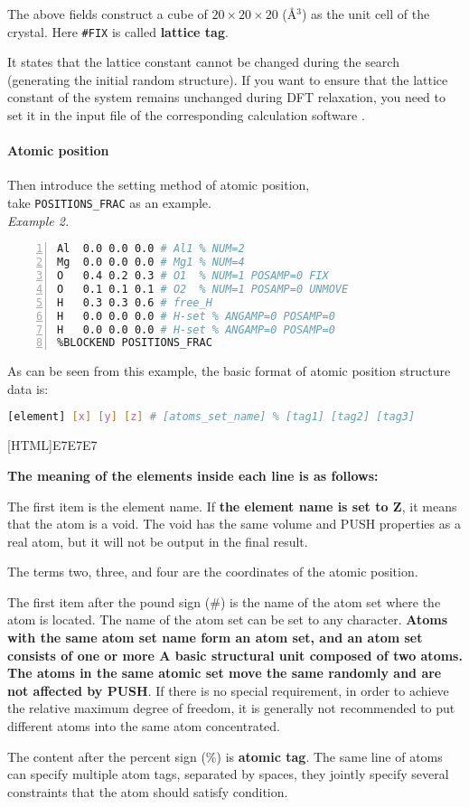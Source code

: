 \documentclass[a4paper, 10pt]{article}
\begin{document}
The above fields construct a cube of \(20\times20\times20\) (\r{A}\(^3\)) as the unit cell of the crystal. Here \verb|#FIX| is called \textbf{lattice tag}.

It states that the lattice constant cannot be changed during the search (generating the initial random structure). If you want to ensure that the lattice constant of the system remains unchanged during DFT relaxation, you need to set it in the input file of the corresponding calculation software .

\paragraph{Atomic position} Then introduce the setting method of atomic position, \\take \verb|POSITIONS_FRAC| as an example.\\
\emph{Example 2.}
\begin{lstlisting}[language={bash},numbers=left]
%BLOCK POSITIONS_FRAC
Al  0.0 0.0 0.0 # Al1 % NUM=2 
Mg  0.0 0.0 0.0 # Mg1 % NUM=4 
O   0.4 0.2 0.3 # O1  % NUM=1 POSAMP=0 FIX
O   0.1 0.1 0.1 # O2  % NUM=1 POSAMP=0 UNMOVE
H   0.3 0.3 0.6 # free_H 
H   0.0 0.0 0.0 # H-set % ANGAMP=0 POSAMP=0
H   0.0 0.0 0.0 # H-set % ANGAMP=0 POSAMP=0
%BLOCKEND POSITIONS_FRAC
\end{lstlisting}

As can be seen from this example, the basic format of atomic position structure data is:
\begin{lstlisting}[language={bash}]
[element] [x] [y] [z] # [atoms_set_name] % [tag1] [tag2] [tag3]
\end{lstlisting}

\noindent{}[HTML]{E7E7E7}{\parbox{\textwidth}{%
\noindent \textbf{The meaning of the elements inside each line is as follows: }
\begin{maineu}
  \item The first item is the element name. If \textbf{the element name is set to Z}, it means that the atom is a void. The void has the same volume and PUSH properties as a real atom, but it will not be output in the final result.
  \item The terms two, three, and four are the coordinates of the atomic position.
  \item The first item after the pound sign (\#) is the name of the atom set where the atom is located. The name of the atom set can be set to any character. \textbf{Atoms with the same atom set name form an atom set, and an atom set consists of one or more A basic structural unit composed of two atoms. The atoms in the same atomic set move the same randomly and are not affected by PUSH}. If there is no special requirement, in order to achieve the relative maximum degree of freedom, it is generally not recommended to put different atoms into the same atom concentrated.
  \item The content after the percent sign (\%) is \textbf{atomic tag}. The same line of atoms can specify multiple atom tags, separated by spaces, they jointly specify several constraints that the atom should satisfy condition.
\end{maineu}}}\\
\end{document}
